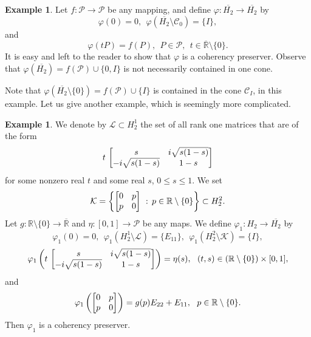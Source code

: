 \documentclass[10pt]{amsart}
\theoremstyle{definition}
\newtheorem{example}[theorem]{Example}
\theoremstyle{remark}
\numberwithin{subsection}{section}
\numberwithin{equation}{section}
\newcommand\cC{{\mathcal{C}}}
\newcommand\cP{{\mathcal{P}}}
\newcommand\oH{{\overline{H_2}}}
\newcommand\oR{{\overline{\mathbb{R}}}}
\begin{document}
\begin{example}\label{exoh}
Let $f\colon \mathcal{P}\to \mathcal{P}$ be any mapping, and define $\varphi\colon \oH\to \oH$ by 
\[
\varphi(0)=0,\ \ \varphi(\oH\setminus\cC_0)=\{I\},
\]
and 
\[
\varphi(tP)=f(P), \ \ P\in \cP,\ \ t\in \oR\setminus\{0\}.
\] 
It is easy and left to the reader to show that $\varphi$ is a coherency preserver.
Observe that $\varphi(\oH)=f(\cP)\cup\{0, I\}$ is not necessarily contained in one cone.
\end{example}
Note that $\varphi(\oH\setminus \{0\})=f(\cP)\cup\{I\}$ is contained in the cone $\mathcal{C}_I$, in this example. 
Let us give another example, which is seemingly more complicated. 
\begin{example}\label{varphi1}
We denote 
by $\mathcal{L} \subset H_{2}^1$ the set of all rank one matrices that are of the form
\[
t \,  \left[ \begin{matrix} s &  i\sqrt{ s (1-s)}  \cr -i \sqrt{ s (1-s)}  & 1 - s  \end{matrix} \right]
\]
for some nonzero real $t$ and some real $s$, $0 \le s \le 1$. 
We set
\[
\mathcal{K} = \left\{ \left[ \begin{matrix} 0 &  p  \cr p & 0  \end{matrix} \right] \ :  \, p \in \mathbb{R} \setminus \{ 0 \} \right\} \subset H_{2}^2.
\]
Let $g \colon \mathbb{R} \setminus \{ 0 \} \to {\oR}$ and $\eta\colon [0,1] \to \mathcal{P}$ be any maps. 
We define $\varphi_1 \colon H_2 \to \oH$ by
\[
\varphi_1 (0) = 0,\ \ \varphi_1 (H_{2}^1 \setminus \mathcal{L}) = \{E_{11}\}, \ \ \varphi_1 (H_{2}^2 \setminus \mathcal{K}) = \{I\},
\]
\[
\varphi_1 \left( t \,  \left[ \begin{matrix} s &  i\sqrt{ s (1-s)}  \cr -i \sqrt{ s (1-s)}  & 1 - s  \end{matrix} \right]  \right) = \eta (s),\ \ (t,s)\in (\mathbb{R} \setminus \{ 0 \})\times [0,1],
\]
and 
\[
\varphi_1 \left( \left[ \begin{matrix} 0 &  p  \cr p & 0  \end{matrix} \right] \right) = g(p) E_{22} + E_{11}, \ \ p\in \mathbb{R} \setminus \{ 0 \}.
\]
Then $\varphi_1$ is a coherency preserver.
\end{example}
\end{document}
